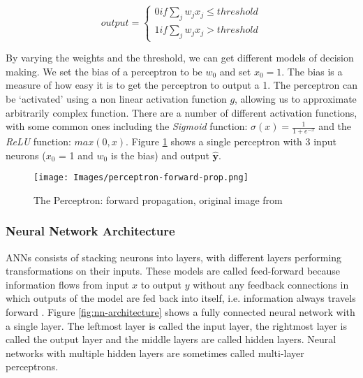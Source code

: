 \begin{equation}
    output = 
    \begin{cases} 
        0 if \sum_jw_jx_j \leqslant threshold \\
        1 if \sum_jw_jx_j > threshold
    \end{cases}
    \label{eq:perceptron}
\end{equation}

By varying the weights and the threshold, we can get different models of decision making. We set the bias of a perceptron to be $w_0$ and set $x_0 = 1$. The bias is a measure of how easy it is to get the perceptron to output a 1. The perceptron can be `activated' using a non linear activation function $g$, allowing us to approximate arbitrarily complex function. There are a number of different activation functions, with some common ones including the \textit{Sigmoid} function: $ \sigma(x) = \frac{1}{1 + e^{-x}} $ and the \textit{ReLU} function: $ max(0, x) $. Figure \ref{fig:perceptron} shows a single perceptron with 3 input neurons ($x_0$ = 1 and $w_0$ is the bias) and output $\mathbf{\hat y}$.

\begin{figure}[H]
\begin{center}
    \texttt{[image: Images/perceptron-forward-prop.png]}
    \caption{The Perceptron: forward propagation, original image from \cite{methods-for-ds-slides}}
    \label{fig:perceptron}
\end{center}
\end{figure}

\subsubsection{Neural Network Architecture}

ANNs consists of stacking neurons into layers, with different layers performing transformations on their inputs. These models are called feed-forward because information flows from input $x$ to output $y$ without any feedback connections in which outputs of the model are fed back into itself, i.e. information always travels forward \cite{deep-learning-book}. Figure \ref{fig:nn-architecture} shows a fully connected neural network with a single layer. The leftmost layer is called the input layer, the rightmost layer is called the output layer and the middle layers are called hidden layers. Neural networks with multiple hidden layers are sometimes called multi-layer perceptrons.

